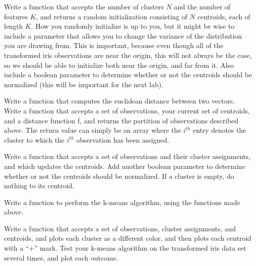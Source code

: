 \begin{problem}
Write a function that accepts the number of clusters $N$ and the number of features $K$, and returns a random initialization consisting of $N$ centroids, each of length $K$. How you randomly initialize is up to you, but it might be wise to include a parameter that allows you to change the variance of the distribution you are drawing from. This is important, because even though all of the transformed iris observations are near the origin, this will not always be the case, so we should be able to initialize both near the origin, and far from it. Also include a boolean parameter to determine whether or not the centroids should be normalized (this will be important for the next lab).
\end{problem}

\begin{problem}
Write a function that computes the euclidean distance between two vectors. Write a function that accepts a set of observations, your current set of centroids, and a distance function f, and returns the partition of observations described above. The return value can simply be an array where the $i^{th}$ entry denotes the cluster to which the $i^{th}$ observation has been assigned.
\end{problem}

\begin{problem}
Write a function that accepts a set of observations and their cluster assignments, and which updates the centroids. Add another boolean parameter to determine whether or not the centroids should be normalized. If a cluster is empty, do nothing to its centroid.
\end{problem}

\begin{problem}
Write a function to perform the k-means algorithm, using the functions made above.
\end{problem}

\begin{problem}
Write a function that accepts a set of observations, cluster assignments, and centroids, and plots each cluster as a different color, and then plots each centroid with a ``+'' mark. Test your k-means algorithm on the transformed iris data set several times, and plot each outcome.
\end{problem}
